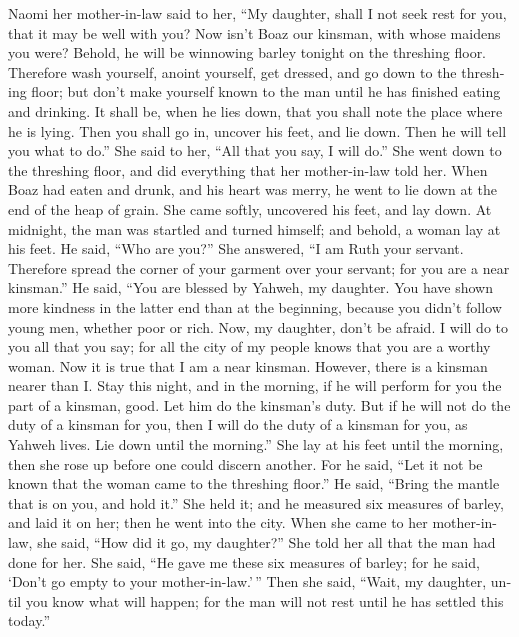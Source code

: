 \begin{paracol}{2}
\begin{otherlanguage}{english}
 Naomi her mother-in-law said to her, ``My daughter, shall
I not seek rest for you, that it may be well with you? 
Now isn't Boaz our kinsman, with whose maidens you were? Behold, he will
be winnowing barley tonight on the threshing floor. 
Therefore wash yourself, anoint yourself, get dressed, and go down to
the threshing floor; but don't make yourself known to the man until he
has finished eating and drinking.  It shall be, when he
lies down, that you shall note the place where he is lying. Then you
shall go in, uncover his feet, and lie down. Then he will tell you what
to do.''  She said to her, ``All that you say, I will
do.''  She went down to the threshing floor, and did
everything that her mother-in-law told her.  When Boaz had
eaten and drunk, and his heart was merry, he went to lie down at the end
of the heap of grain. She came softly, uncovered his feet, and lay down.
 At midnight, the man was startled and turned himself; and
behold, a woman lay at his feet.  He said, ``Who are
you?'' She answered, ``I am Ruth your servant. Therefore spread the
corner of your garment over your servant; for you are a near kinsman.''
 He said, ``You are blessed by Yahweh, my daughter. You
have shown more kindness in the latter end than at the beginning,
because you didn't follow young men, whether poor or rich.
 Now, my daughter, don't be afraid. I will do to you all
that you say; for all the city of my people knows that you are a worthy
woman.  Now it is true that I am a near kinsman. However,
there is a kinsman nearer than I.  Stay this night, and
in the morning, if he will perform for you the part of a kinsman, good.
Let him do the kinsman's duty. But if he will not do the duty of a
kinsman for you, then I will do the duty of a kinsman for you, as Yahweh
lives. Lie down until the morning.''  She lay at his feet
until the morning, then she rose up before one could discern another.
For he said, ``Let it not be known that the woman came to the threshing
floor.''  He said, ``Bring the mantle that is on you, and
hold it.'' She held it; and he measured six measures of barley, and laid
it on her; then he went into the city.  When she came to
her mother-in-law, she said, ``How did it go, my daughter?'' She told
her all that the man had done for her.  She said, ``He
gave me these six measures of barley; for he said, `Don't go empty to
your mother-in-law.'\,''  Then she said, ``Wait, my
daughter, until you know what will happen; for the man will not rest
until he has settled this today.''


\end{otherlanguage}
\end{paracol}
